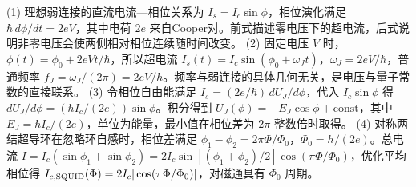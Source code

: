 (1) 理想弱连接的直流电流—相位关系为 \(I_s=I_c\sin\phi\)，相位演化满足 \(\hbar\,d\phi/dt=2eV\)，其中电荷 \(2e\) 来自Cooper对。前式描述零电压下的超电流，后式说明非零电压会使两侧相对相位连续随时间改变。
(2) 固定电压 \(V\) 时，\(\phi(t)=\phi_0+2eVt/\hbar\)，所以超电流 \(I_s(t)=I_c\sin(\phi_0+\omega_Jt)\)，\(\omega_J=2eV/\hbar\)，普通频率 \(f_J=\omega_J/(2\pi)=2eV/h\)。频率与弱连接的具体几何无关，是电压与量子常数的直接联系。
(3) 令相位自由能满足 \(I_s=(2e/\hbar)\,dU_J/d\phi\)，代入 \(I_c\sin\phi\) 得 \(dU_J/d\phi=(\hbar I_c/(2e))\sin\phi\)。积分得到 \(U_J(\phi)=-E_J\cos\phi+\mathrm{const}\)，其中 \(E_J=\hbar I_c/(2e)\)，单位为能量，最小值在相位差为 \(2\pi\) 整数倍时取得。
(4) 对称两结超导环在忽略环自感时，相位差满足 \(\phi_1-\phi_2=2\pi\Phi/\Phi_0\)，\(\Phi_0=h/(2e)\)。总电流 \(I=I_c(\sin\phi_1+\sin\phi_2)=2I_c\sin[(\phi_1+\phi_2)/2]\cos(\pi\Phi/\Phi_0)\)，优化平均相位得 \(I_{c,\rm SQUID}(\Phi)=2I_c|\cos(\pi\Phi/\Phi_0)|\)，对磁通具有 \(\Phi_0\) 周期。
